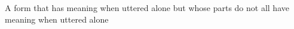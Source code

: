 A form that has meaning when uttered alone but whose parts do not all have meaning when uttered alone
